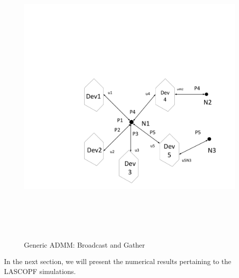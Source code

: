 \documentclass[preprint,12pt,3p]{elsarticle}
\begin{document}
\begin{figure}
\begin{center}
\vspace*{-2cm}
\hspace*{-4cm}
\includegraphics[height=15cm,width=20cm]{Prox.pdf}
\caption{Generic ADMM: Broadcast and Gather}
\label{ADMMGen}
\end{center}
\end{figure}
In the next section, we will present the numerical results pertaining to the LASCOPF simulations.
%
%
\end{document}
